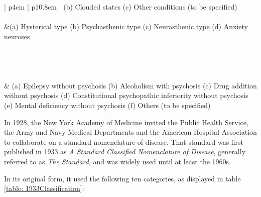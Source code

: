 \begin{refsection}
\begin{longtable}[!t]{ | p{4cm} | p{10.8cm} | }
(b) Clouded states \newline
(c) Other conditions (to be specified) \\ \hline
{} \\ \hline
 &(a) Hysterical type \newline
(b) Psychasthenic type \newline
(c) Neurasthenic type \newline
(d) Anxiety neuroses \\ \hline
{}  \\ \hline
{} \\ \hline
{} \\ \hline
{} \\ \hline
 & (a) Epilepsy without psychosis \newline
(b) Alcoholism with psychosis \newline
(c) Drug addition without psychosis \newline
(d) Constitutional psychopathic inferiority without psychosis \newline
(e) Mental deficiency without psychosis \newline
(f) Others (to be specified)\\ \hline
\caption{\emph{Statistical Manual for the Use of Institutions for the Insane classification of insanity}, 1918}
\label{table: 1918Classification}
\end{longtable}


In 1928, the New York Academy of Medicine invited the Public Health Service, the Army and Navy Medical Departments and the American Hospital Association to collaborate on a standard nomenclature of disease. That standard was first published in 1933 as \emph{A Standard Classified Nomenclature of Disease}, generally referred to as \emph{The Standard}, and was widely used until at least the 1960s. ~\citep{Houts:2000vp}

In its original form, it used the following ten categories, as displayed in table \ref{table: 1933Classification}:


\end{refsection}
